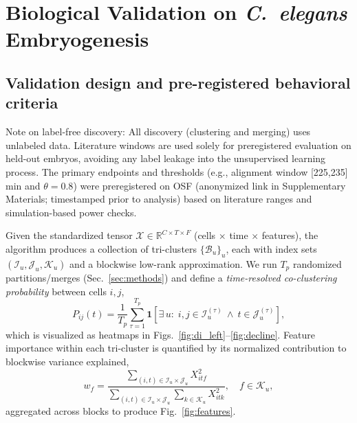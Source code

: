 \documentclass[unnumsec,webpdf,modern,large,namedate]{oup-authoring-template}%
\theoremstyle{thmstyleone}\newtheorem{theorem}{Theorem}
\theoremstyle{thmstyletwo}\newtheorem{example}{Example}
\theoremstyle{thmstylethree}\newtheorem{definition}{Definition}
\begin{document}
\section{Biological Validation on \textit{C.~elegans} Embryogenesis}
\label{sec:celegans_validation}

\subsection{Validation design and pre-registered behavioral criteria}
Note on label-free discovery: All discovery (clustering and merging) uses unlabeled data. Literature windows are used solely for preregistered evaluation on held-out embryos, avoiding any label leakage into the unsupervised learning process. The primary endpoints and thresholds (e.g., alignment window [225,235] min and $\theta=0.8$) were preregistered on OSF (anonymized link in Supplementary Materials; timestamped prior to analysis) based on literature ranges and simulation-based power checks.

Given the standardized tensor $\mathcal{X}\in\mathbb{R}^{C\times T\times F}$ (cells $\times$ time $\times$ features), the algorithm produces a collection of tri-clusters $\{\mathcal{B}_u\}_u$, each with index sets $(\mathcal{I}_u,\mathcal{J}_u,\mathcal{K}_u)$ and a blockwise low-rank approximation. We run $T_p$ randomized partitions/merges (Sec.~\ref{sec:methods}) and define a \emph{time-resolved co-clustering probability} between cells $i,j$,
\begin{equation}
P_{ij}(t)=\frac{1}{T_p}\sum_{\tau=1}^{T_p}\mathbf{1}\!\left[\exists\,u:\; i,j\in\mathcal{I}_u^{(\tau)}\ \wedge\ t\in\mathcal{J}_u^{(\tau)}\right],
\label{eq:coclust_prob}
\end{equation}
which is visualized as heatmaps in Figs.~\ref{fig:di_left}--\ref{fig:decline}. Feature importance within each tri-cluster is quantified by its normalized contribution to blockwise variance explained,
\begin{equation}
w_f = \frac{\sum_{(i,t)\in\mathcal{I}_u\times\mathcal{J}_u} X_{itf}^2}{\sum_{(i,t)\in\mathcal{I}_u\times\mathcal{J}_u}\sum_{k\in\mathcal{K}_u} X_{itk}^2},\quad f\in\mathcal{K}_u,
\label{eq:feature_weight}
\end{equation}
aggregated across blocks to produce Fig.~\ref{fig:features}.
\end{document}
